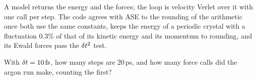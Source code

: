 \begin{keyidea}
A model returns the energy and the forces; the loop is velocity Verlet
over it with one call per step. The code agrees with ASE to the rounding
of the arithmetic once both use the same constants, keeps the energy of a
periodic crystal with a fluctuation 0.3\% of that of its kinetic energy
and its momentum to rounding, and its Ewald forces pass the $\delta t^2$ test.
\end{keyidea}


\begin{selfcheck}
With $\dt = \SI{10}{\femto\second}$, how many steps are 20\,ps, and how
many force calls did the argon run make, counting the first?
\end{selfcheck}
